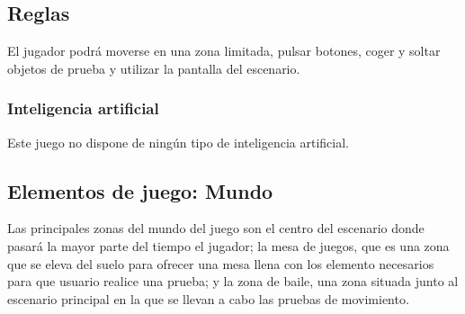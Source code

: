 
\subsection{Reglas}
El jugador podrá moverse en una zona limitada, pulsar botones, coger y soltar objetos de prueba y utilizar la pantalla del escenario.


\subsubsection{Inteligencia artificial}
Este juego no dispone de ningún tipo de inteligencia artificial.

\subsection{Elementos de juego: Mundo}
Las principales zonas del mundo del juego son el centro del escenario donde pasará la mayor parte del tiempo el jugador; la mesa de juegos, que es una zona que se eleva del suelo para ofrecer una mesa llena con los elemento necesarios para que usuario realice una prueba; y la zona de baile, una zona situada junto al escenario principal en la que se llevan a cabo las pruebas de movimiento.

